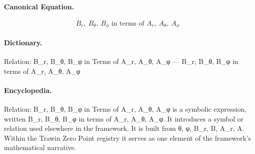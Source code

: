 \paragraph{Canonical Equation.}
\[
B_r,\ B_\theta,\ B_\phi \text{ in terms of } A_r,\ A_\theta,\ A_\phi
\]

\paragraph{Dictionary.}
Relation: B\_r, B\_θ, B\_φ in Terms of A\_r, A\_θ, A\_φ — B\_r, B\_θ, B\_φ in terms of A\_r, A\_θ, A\_φ

\paragraph{Encyclopedia.}
Relation: B\_r, B\_θ, B\_φ in Terms of A\_r, A\_θ, A\_φ is a symbolic expression, written B\_r, B\_θ, B\_φ in terms of A\_r, A\_θ, A\_φ. It introduces a symbol or relation used elsewhere in the framework. It is built from θ, φ, B\_r, B, A\_r, A. Within the Trawin Zero Point registry it serves as one element of the framework's mathematical narrative.
